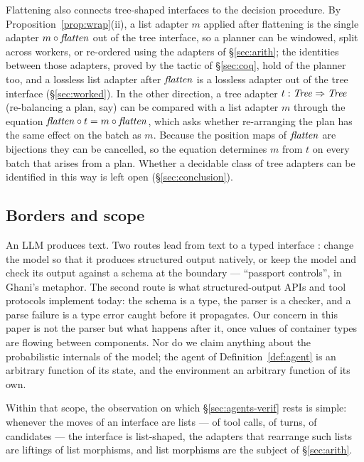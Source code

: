 \documentclass{fundam}
\begin{document}
Flattening also connects tree-shaped interfaces to the decision procedure.  By
Proposition~\ref{prop:wrap}(ii), a list adapter $m$ applied after flattening is the single
adapter $m \circ \mathit{flatten}$ out of the tree interface, so a planner can be windowed,
split across workers, or re-ordered using the adapters of \S\ref{sec:arith}; the
identities between those adapters, proved by the tactic of \S\ref{sec:coq}, hold of the
planner too, and a lossless list adapter after $\mathit{flatten}$ is a lossless adapter out of
the tree interface (\S\ref{sec:worked}).  In the other direction, a tree adapter
$t : \mathit{Tree} \Rightarrow \mathit{Tree}$ (re-balancing a plan, say) can be compared with a list
adapter $m$ through the equation $\mathit{flatten} \circ t = m \circ \mathit{flatten}$, which asks
whether re-arranging the plan has the same effect on the batch as $m$.  Because the
position maps of $\mathit{flatten}$ are bijections they can be cancelled, so the equation
determines $m$ from $t$ on every batch that arises from a plan.  Whether a decidable class
of tree adapters can be identified in this way is left open (\S\ref{sec:conclusion}).

\subsection{Borders and scope}\label{sec:borders}

An LLM produces text.  Two routes lead from text to a typed interface
\cite{GhaniPodcast26}: change the model so that it produces structured output natively,
or keep the model and check its output against a schema at the boundary --- ``passport
controls'', in Ghani's metaphor.  The second route is what structured-output APIs
\cite{OpenAIStructured24} and tool protocols \cite{MCP24} implement today: the schema is
a type, the parser is a checker, and a parse failure is a type error caught before it
propagates.  Our concern in this paper is not the parser but what happens after it, once
values of container types are flowing between components.  Nor do we claim anything about
the probabilistic internals of the model; the agent of Definition~\ref{def:agent} is an
arbitrary function of its state, and the environment an arbitrary function of its own.

Within that scope, the observation on which \S\ref{sec:agents-verif} rests is simple:
whenever the moves of an interface are lists --- of tool calls, of turns, of candidates
--- the interface is list-shaped, the adapters that rearrange such lists are liftings of
list morphisms, and list morphisms are the subject of \S\ref{sec:arith}.
\end{document}
